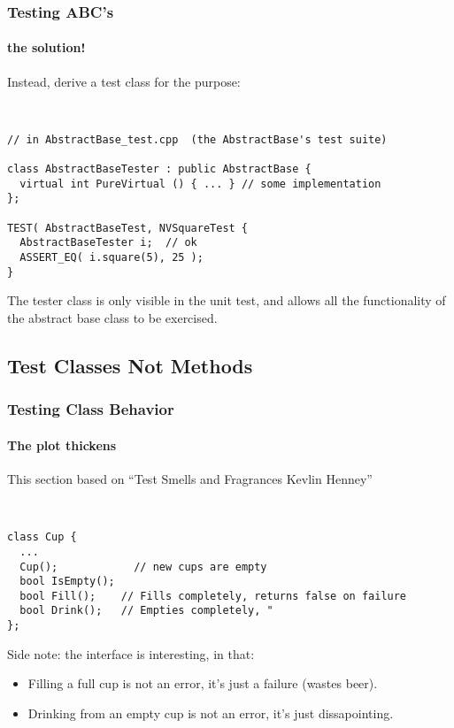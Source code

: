 \begin{frame}[fragile,t]
\frametitle{Testing ABC's}
\framesubtitle{the solution!}
Instead, derive a test class for the purpose:
{\scriptsize\
\begin{verbatim}
// in AbstractBase_test.cpp  (the AbstractBase's test suite)

class AbstractBaseTester : public AbstractBase {
  virtual int PureVirtual () { ... } // some implementation 
};

TEST( AbstractBaseTest, NVSquareTest {
  AbstractBaseTester i;  // ok
  ASSERT_EQ( i.square(5), 25 );
}
\end{verbatim}}
The tester class is only visible in the unit test, and allows all the
functionality of the abstract base class to be exercised.

\end{frame}


\subsection{Test Classes Not Methods}
\begin{frame}[fragile,t]
\frametitle{Testing Class Behavior}
\framesubtitle{The plot thickens}
This section based on
``Test Smells and Fragrances Kevlin Henney'' 
{\scriptsize\
\begin{verbatim}
class Cup {
  ...
  Cup();            // new cups are empty
  bool IsEmpty(); 
  bool Fill();    // Fills completely, returns false on failure
  bool Drink();   // Empties completely, "
};

\end{verbatim}}

Side note: the interface is interesting, in that:
\begin{itemize}
  \item Filling a full cup is not an error, it's just a failure
    (wastes beer).
  \item Drinking from an empty cup is not an error, it's just
    dissapointing.
\end{itemize}


\end{frame}

